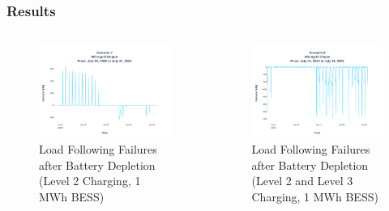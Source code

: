 \documentclass[aspectratio=169, 8 pt]{beamer}
\begin{document}
	\begin{frame}
	\frametitle{Results}
	\begin{columns}
		\begin{column}{0.5\linewidth}
			\begin{block}{}
				\begin{figure}
					\centering
					\includegraphics[width=\linewidth]{Fig/Option_3/4_Scenario_7_Run_3_Mg_Output_Jul_01_2022_to_Jul_31_2022.pdf}
					\caption{\footnotesize Load Following Failures after Battery Depletion (Level 2 Charging, 1 MWh BESS)}
					\label{fig:scenario3peakshaving}
				\end{figure}
			\end{block}
		\end{column}
		\begin{column}{0.5\linewidth}
			\begin{block}{}
				\begin{figure}
					\centering
					\includegraphics[width=\linewidth]{Fig/Option_3/4_Scenario_8_Run_3_Mg_Output_Jul_01_2022_to_Jul_31_2022.pdf}
					\caption{\footnotesize Load Following Failures after Battery Depletion (Level 2 and Level 3 Charging, 1 MWh BESS)}
					\label{fig:scenario4peakshaving}
				\end{figure}
			\end{block}
		\end{column}
	\end{columns}
\end{frame}
	
\end{document}
